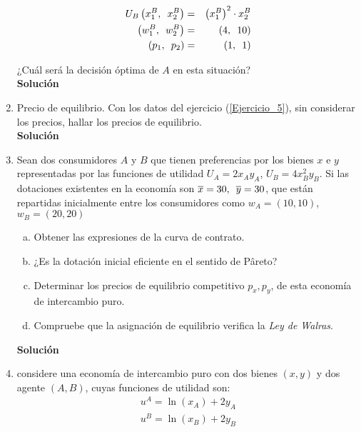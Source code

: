 \documentclass[10pt,a4paper]{article}
\begin{document}
\begin{enumerate}
\begin{multicols}{2}
				\begin{eqnarray*}
					U_{B} \left(x_{1}^{B},\enskip x_{2}^{B} \right) & = &  \left(x_{1}^{B} \right)^{2}\cdot x_{2}^{B}\\
					\left( w_{1}^{B},\enskip w_{2}^{B} \right) & = & \left(4,\enskip 10 \right) \\
					\left(p_1,\enskip p_2 \right) & = &\left(1,\enskip 1 \right)
				\end{eqnarray*}
			\end{multicols}
		  ¿Cuál será la decisión óptima de $A$ en esta situación?\\[0.5cm]
			\textbf{\LARGE Solución}\\
				
	\item Precio de equilibrio. Con los datos del ejercicio (\ref{Ejercicio_5}), sin considerar los precios, hallar los precios de equilibrio.\\[0.5cm]
		\textbf{\LARGE Solución}\\
			
	\item Sean dos consumidores $A$ y $B$ que tienen preferencias por los bienes $x$ e $y$ representadas por las funciones de utilidad $U_{A} = 2x_{A}y_{A}$, $U_{B} = 4x_{B}^{2}y_{B}$. Si las dotaciones existentes en la economía son $\overline{x} = 30,\enskip \overline{y} = 30$, que están repartidas inicialmente entre los consumidores como $w_{A} = (10, 10)$, $w_{B}=(20,20)$
		\begin{enumerate}[a)]
			\item Obtener las expresiones de la curva de contrato.
			\item ¿Es la dotación inicial eficiente en el sentido de Pâreto?
			\item Determinar los precios de equilibrio competitivo $p_{x}, p_{y}$, de esta economía de intercambio puro.
			\item Compruebe que la asignación de equilibrio verifica la \emph{Ley de Walras}.
		\end{enumerate}
				\vspace{0.5cm}
					\textbf{\LARGE Solución}\\
						
	\item considere una economía de intercambio puro con dos bienes $(x, y)$ y dos agente $(A, B)$, cuyas funciones de utilidad son:
			\begin{gather*}
				u^{A} = \ln(x_A) + 2y_A\\
				u^{B} = \ln(x_B) + 2y_B
			\end{gather*}

\end{enumerate}
\end{document}
